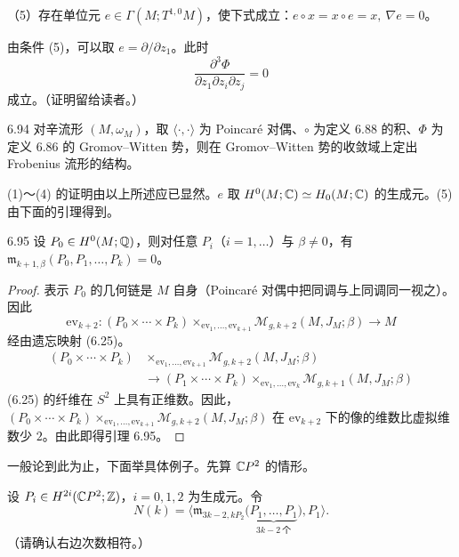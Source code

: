 （5）存在单位元 $e\in\Gamma(M;T^{1,0}M)$，使下式成立：$e\circ x=x\circ e=x,\ \nabla e=0$。

由条件 (5)，可以取 $e=\partial/\partial z_1$。此时
\[
  \frac{\partial^3\Phi}{\partial z_1\partial z_i\partial z_j}=0
\]
成立。（证明留给读者。）

\begin{theorem}{6.94}
  对辛流形 $(M,\omega_M)$，取 $\langle\cdot,\cdot\rangle$ 为 Poincaré 对偶、$\circ$ 为定义 6.88 的积、$\Phi$ 为定义 6.86 的 Gromov–Witten 势，则在 Gromov–Witten 势的收敛域上定出 Frobenius 流形的结构。
\end{theorem}

(1)～(4) 的证明由以上所述应已显然。$e$ 取 $H^0(M;\mathbb{C})\simeq H_0(M;\mathbb{C})$ 的生成元。(5) 由下面的引理得到。

\begin{lemma*}{6.95}
  设 $P_0\in H^0(M;\mathbb{Q})$，则对任意 $P_i$（$i=1,\dots$）与 $\beta\ne0$，有 $\mathfrak{m}_{k+1,\beta}(P_0,P_1,\dots,P_k)=0$。
\end{lemma*}

\begin{proof}
  表示 $P_0$ 的几何链是 $M$ 自身（Poincaré 对偶中把同调与上同调同一视之）。因此
  \[
    \mathrm{ev}_{k+2}\colon(P_0\times\cdots\times P_k)
    \times_{\mathrm{ev}_1,\dots,\mathrm{ev}_{k+1}}\mathcal{M}_{g,k+2}(M,J_M;\beta)\to M
  \]
  经由遗忘映射 (6.25)。
  \begin{equation}
  \begin{aligned}
    (P_0\times\cdots\times P_k)&\times_{\mathrm{ev}_1,\dots,\mathrm{ev}_{k+1}}
    \mathcal{M}_{g,k+2}(M,J_M;\beta)\\
    &\longrightarrow(P_1\times\cdots\times P_k)
    \times_{\mathrm{ev}_1,\dots,\mathrm{ev}_k}\mathcal{M}_{g,k+1}(M,J_M;\beta)
  \end{aligned}
  \tag{6.25}
  \end{equation}
  (6.25) 的纤维在 $S^2$ 上具有正维数。因此，$(P_0\times\cdots\times P_k)\times_{\mathrm{ev}_1,\dots,\mathrm{ev}_{k+1}}\mathcal{M}_{g,k+2}(M,J_M;\beta)$ 在 $\mathrm{ev}_{k+2}$ 下的像的维数比虚拟维数少 $2$。由此即得引理 6.95。
\end{proof}

一般论到此为止，下面举具体例子。先算 $\mathbb{C} P^2$ 的情形。

设 $P_i\in H^{2i}(\mathbb{C} P^2;\mathbb{Z})$，$i=0,1,2$ 为生成元。令
\begin{equation}
  N(k)=\Big\langle\mathfrak{m}_{3k-2,kP_2}\big(\underbrace{P_1,\dots,P_1}_{3k-2\ \text{个}}\big),P_1\Big\rangle . \tag{6.26}
\end{equation}
（请确认右边次数相符。）

